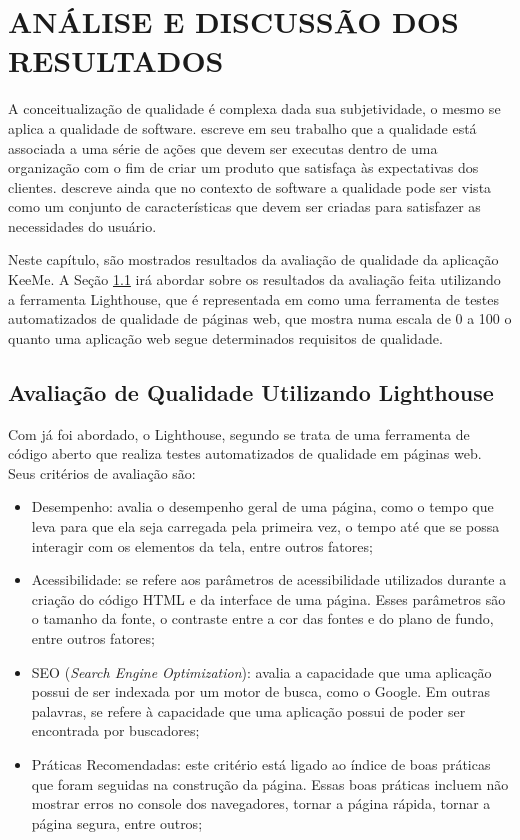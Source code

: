 
\chapter{ANÁLISE E DISCUSSÃO DOS RESULTADOS}
\label{chap:resultados}

A conceitualização de qualidade é complexa dada sua subjetividade, o mesmo se aplica a qualidade de software. \cite{morais2010qualidade} escreve em seu trabalho que a qualidade está associada a uma série de ações que devem ser executas dentro de uma organização com o fim de criar um produto que satisfaça às expectativas dos clientes. \cite{morais2010qualidade} descreve ainda que no contexto de software a qualidade pode ser vista como um conjunto de características que devem ser criadas para satisfazer as necessidades do usuário.

Neste capítulo, são mostrados resultados da avaliação de qualidade da aplicação KeeMe. A Seção \ref{sec:lighthouse} irá abordar sobre os resultados da avaliação feita utilizando a ferramenta Lighthouse, que é representada em \cite{lighthouse} como uma ferramenta de testes automatizados de qualidade de páginas web, que mostra numa escala de 0 a 100 o quanto uma aplicação web segue determinados requisitos de qualidade.


\section{Avaliação de Qualidade Utilizando Lighthouse}
\label{sec:lighthouse}

Com já foi abordado, o Lighthouse, segundo \cite{lighthouse} se trata de uma ferramenta de código aberto que realiza testes automatizados de qualidade em páginas web. Seus critérios de avaliação são:

\begin{itemize}
    \item Desempenho: avalia o desempenho geral de uma página, como o tempo que leva para que ela seja carregada pela primeira vez, o tempo até que se possa interagir com os elementos da tela, entre outros fatores;
    \item Acessibilidade: se refere aos parâmetros de acessibilidade utilizados durante a criação do código HTML e da interface de uma página. Esses parâmetros são o tamanho da fonte, o contraste entre a cor das fontes e do plano de fundo, entre outros fatores;
    \item SEO (\textit{Search Engine Optimization}): avalia a capacidade que uma aplicação possui de ser indexada por um motor de busca, como o Google. Em outras palavras, se refere à capacidade que uma aplicação possui de poder ser encontrada por buscadores;
    \item Práticas Recomendadas: este critério está ligado ao índice de boas práticas que foram seguidas na construção da página. Essas boas práticas incluem não mostrar erros no console dos navegadores, tornar a página rápida, tornar a página segura, entre outros;
\end{itemize}

